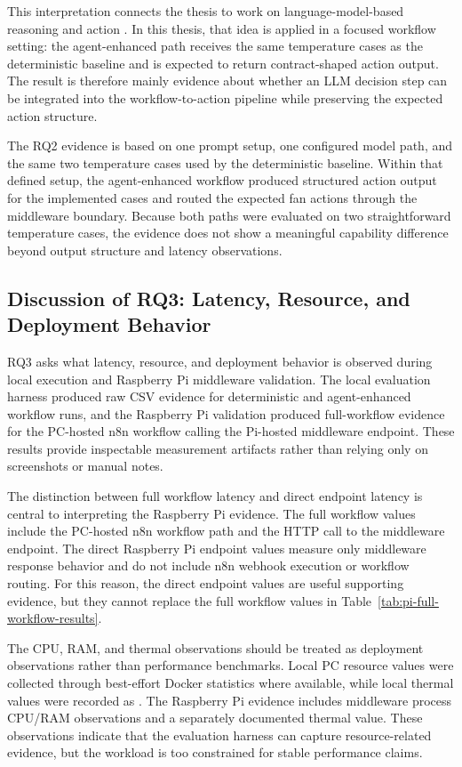 This interpretation connects the thesis to work on language-model-based reasoning and action \cite{reactYao2023}. In this thesis, that idea is applied in a focused workflow setting: the agent-enhanced path receives the same temperature cases as the deterministic baseline and is expected to return contract-shaped action output. The result is therefore mainly evidence about whether an LLM decision step can be integrated into the workflow-to-action pipeline while preserving the expected action structure.


The RQ2 evidence is based on one prompt setup, one configured model path, and the same two temperature cases used by the deterministic baseline. Within that defined setup, the agent-enhanced workflow produced structured action output for the implemented cases and routed the expected fan actions through the middleware boundary. Because both paths were evaluated on two straightforward temperature cases, the evidence does not show a meaningful capability difference beyond output structure and latency observations.

\subsection{Discussion of RQ3: Latency, Resource, and Deployment Behavior}\label{subsec:discussion-rq3-latency-resource-deployment}

RQ3 asks what latency, resource, and deployment behavior is observed during local execution and Raspberry Pi middleware validation. The local evaluation harness produced raw CSV evidence for deterministic and agent-enhanced workflow runs, and the Raspberry Pi validation produced full-workflow evidence for the PC-hosted n8n workflow calling the Pi-hosted middleware endpoint. These results provide inspectable measurement artifacts rather than relying only on screenshots or manual notes.

The distinction between full workflow latency and direct endpoint latency is central to interpreting the Raspberry Pi evidence. The full workflow values include the PC-hosted n8n workflow path and the HTTP call to the middleware endpoint. The direct Raspberry Pi endpoint values measure only middleware response behavior and do not include n8n webhook execution or workflow routing. For this reason, the direct endpoint values are useful supporting evidence, but they cannot replace the full workflow values in Table~\ref{tab:pi-full-workflow-results}.

The CPU, RAM, and thermal observations should be treated as deployment observations rather than performance benchmarks. Local PC resource values were collected through best-effort Docker statistics where available, while local thermal values were recorded as . The Raspberry Pi evidence includes middleware process CPU/RAM observations and a separately documented thermal value. These observations indicate that the evaluation harness can capture resource-related evidence, but the workload is too constrained for stable performance claims.

